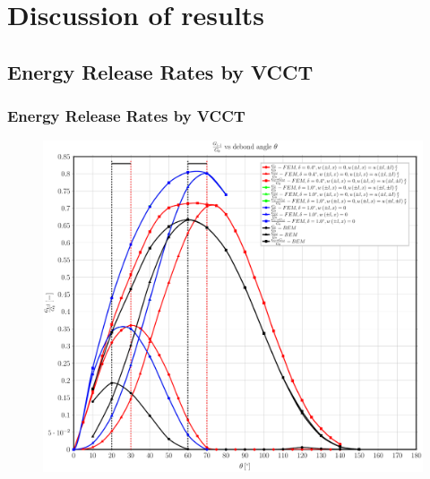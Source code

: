 \documentclass[first,firstsupp,lastsupp,handout,last,hyperref,table]{ETHclass}
\begin{document}
\section{Discussion of results}

\subsection{Energy Release Rates by VCCT}

\begin{frame}
\frametitle{\vspace{0.35cm}\scriptsize Energy Release Rates by VCCT}
\vspace{-1.cm}
\begin{figure}
\includegraphics[height=0.9\textheight]{AbqRunSummary_GsoverG0_FEM-BEM-comparison.pdf}
\end{figure}
\end{frame}
\end{document}

